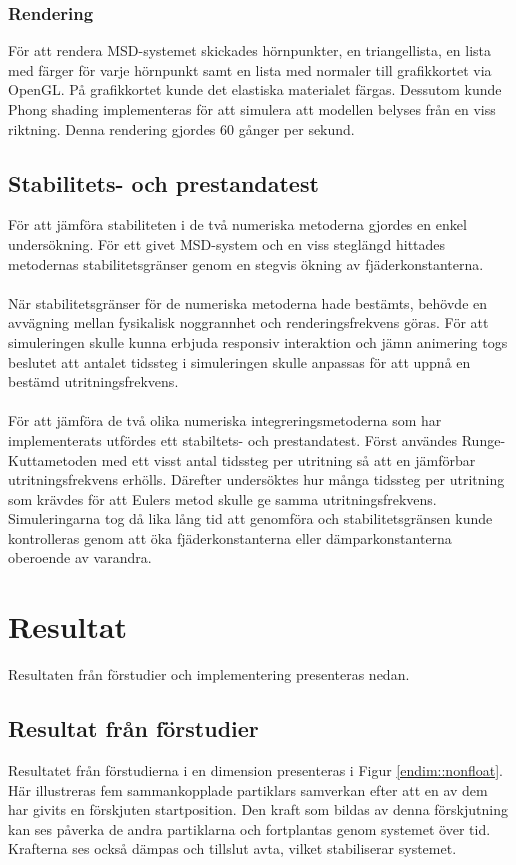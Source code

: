 \documentclass[a4paper,12pt,oneside,final,swedish]{extarticle}
\begin{document}
\subsubsection{Rendering}
För att rendera MSD-systemet skickades hörnpunkter, en triangellista, en lista med färger för varje hörnpunkt samt en lista med normaler till grafikkortet via OpenGL. På grafikkortet kunde det elastiska materialet färgas. Dessutom kunde Phong shading implementeras för att simulera att modellen belyses från en viss riktning. Denna rendering gjordes 60 gånger per sekund.
\subsection{Stabilitets- och prestandatest}
För att jämföra stabiliteten i de två numeriska metoderna gjordes en enkel undersökning. För ett givet MSD-system och en viss steglängd hittades metodernas stabilitetsgränser genom en stegvis ökning av fjäderkonstanterna.
\\\\När stabilitetsgränser för de numeriska metoderna hade bestämts, behövde en avvägning mellan fysikalisk noggrannhet och renderingsfrekvens göras. För att simuleringen skulle kunna erbjuda responsiv interaktion och jämn animering togs beslutet att antalet tidssteg i simuleringen skulle anpassas för att uppnå en bestämd utritningsfrekvens.
\\\\För att jämföra de två olika numeriska integreringsmetoderna som har implementerats utfördes ett stabiltets- och prestandatest. Först användes Runge-Kuttametoden med ett visst antal tidssteg per utritning så att en jämförbar utritningsfrekvens erhölls. Därefter undersöktes hur många tidssteg per utritning som krävdes för att Eulers metod skulle ge samma utritningsfrekvens. Simuleringarna tog då lika lång tid att genomföra och stabilitetsgränsen kunde kontrolleras genom att öka fjäderkonstanterna eller dämparkonstanterna oberoende av varandra.
\section{Resultat}
Resultaten från förstudier och implementering presenteras nedan.
\subsection{Resultat från förstudier}
Resultatet från förstudierna i en dimension presenteras i Figur \ref{endim::nonfloat}. Här illustreras fem sammankopplade partiklars samverkan efter att en av dem har givits en förskjuten startposition. Den kraft som bildas av denna förskjutning kan ses påverka de andra partiklarna och fortplantas genom systemet över tid. Krafterna ses också dämpas och tillslut avta, vilket stabiliserar systemet.
\end{document}
